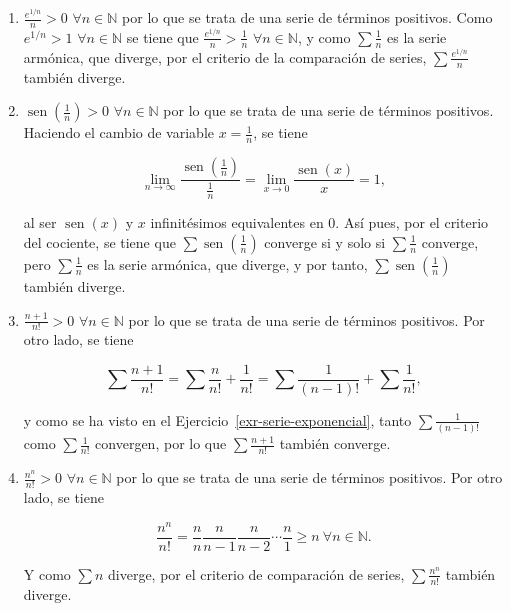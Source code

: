 \documentclass[
  spanish,
  a4paper,
]{scrreport}
\theoremstyle{definition}
\theoremstyle{remark}
\begin{document}
\begin{tcolorbox}
\begin{enumerate}
  Como \(\sum \frac{1}{n^{1/2}}\) es una serie \(p\) con \(p<1\),
  diverge, y por tanto, \(\sum \frac{n+1}{\sqrt{n^3}}\) también diverge.
\item
  \(\frac{e^{1/n}}{n}>0\) \(\forall n\in\mathbb{N}\) por lo que se trata
  de una serie de términos positivos. Como \(e^{1/n}>1\)
  \(\forall n\in\mathbb{N}\) se tiene que
  \(\frac{e^{1/n}}{n}>\frac{1}{n}\) \(\forall n\in\mathbb{N}\), y como
  \(\sum \frac{1}{n}\) es la serie armónica, que diverge, por el
  criterio de la comparación de series, \(\sum \frac{e^{1/n}}{n}\)
  también diverge.
\item
  \(\operatorname{sen}\left(\frac{1}{n}\right)>0\)
  \(\forall n\in\mathbb{N}\) por lo que se trata de una serie de
  términos positivos. Haciendo el cambio de variable \(x=\frac{1}{n}\),
  se tiene

  \[
   \lim_{n\to\infty}\frac{\operatorname{sen}\left(\frac{1}{n}\right)}{\frac{1}{n}} = \lim_{x\to 0}\frac{\operatorname{sen}(x)}{x} = 1,
   \]

  al ser \(\operatorname{sen}(x)\) y \(x\) infinitésimos equivalentes en
  \(0\). Así pues, por el criterio del cociente, se tiene que
  \(\sum \operatorname{sen}\left(\frac{1}{n}\right)\) converge si y solo
  si \(\sum \frac{1}{n}\) converge, pero \(\sum \frac{1}{n}\) es la
  serie armónica, que diverge, y por tanto,
  \(\sum \operatorname{sen}\left(\frac{1}{n}\right)\) también diverge.
\item
  \(\frac{n+1}{n!}>0\) \(\forall n\in\mathbb{N}\) por lo que se trata de
  una serie de términos positivos. Por otro lado, se tiene

  \[
   \sum \frac{n+1}{n!} = \sum \frac{n}{n!}+\frac{1}{n!} = \sum \frac{1}{(n-1)!}+\sum \frac{1}{n!},
   \]

  y como se ha visto en el Ejercicio~\ref{exr-serie-exponencial}, tanto
  \(\sum \frac{1}{(n-1)!}\) como \(\sum \frac{1}{n!}\) convergen, por lo
  que \(\sum \frac{n+1}{n!}\) también converge.
\item
  \(\frac{n^n}{n!}>0\) \(\forall n\in\mathbb{N}\) por lo que se trata de
  una serie de términos positivos. Por otro lado, se tiene

  \[ \frac{n^n}{n!} = \frac{n}{n} \frac{n}{n-1} \frac{n}{n-2} \cdots \frac{n}{1}\geq n \ \forall n\in \mathbb{N}.
   \]

  Y como \(\sum n\) diverge, por el criterio de comparación de series,
  \(\sum \frac{n^n}{n!}\) también diverge.
\end{enumerate}

\end{tcolorbox}
\end{document}
